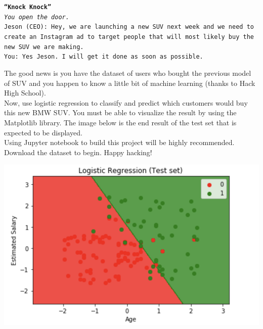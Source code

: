 \documentclass{42-en}
\begin{document}
\texttt{\textbf{“Knock Knock”}\\
\textit{You open the door.}\\

Jeson (CEO): Hey, we are launching a new SUV next week and we need to create an Instagram ad to target people that will most likely buy the new SUV we are making.\\
You: Yes Jeson. I will get it done as soon as possible.\\}

The good news is you have the dataset of users who bought the previous model of SUV and you happen to know a little bit of machine learning (thanks to Hack High School).\\
Now, use logistic regression to classify and predict which customers would buy this new BMW SUV. You must be able to visualize the result by using the Matplotlib library. The image below is the end result of the test set that is expected to be displayed.\\

Using Jupyter notebook to build this project will be highly recommended. Download the dataset to begin. Happy hacking!\\


\centerline{\includegraphics[width=150mm]{images/lr_testset.png}}

\nextexercice
\newpage

\end{document}
